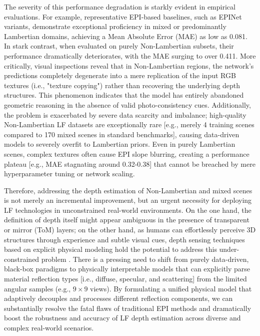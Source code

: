 \documentclass[lettersize,journal]{IEEEtran}
\begin{document}
The severity of this performance degradation is starkly evident in empirical evaluations. For example, representative EPI-based baselines, such as EPINet variants, demonstrate exceptional proficiency in mixed or predominantly Lambertian domains, achieving a Mean Absolute Error (MAE) as low as 0.081. In stark contrast, when evaluated on purely Non-Lambertian subsets, their performance dramatically deteriorates, with the MAE surging to over 0.411. More critically, visual inspections reveal that in Non-Lambertian regions, the network's predictions completely degenerate into a mere replication of the input RGB textures (i.e., "texture copying") rather than recovering the underlying depth structures. This phenomenon indicates that the model has entirely abandoned geometric reasoning in the absence of valid photo-consistency cues. Additionally, the problem is exacerbated by severe data scarcity and imbalance; high-quality Non-Lambertian LF datasets are exceptionally rare  [e.g., merely 4 training scenes compared to 170 mixed scenes in standard benchmarks], causing data-driven models to severely overfit to Lambertian priors. Even in purely Lambertian scenes, complex textures often cause EPI slope blurring, creating a performance plateau  [e.g., MAE stagnating around 0.32-0.38] that cannot be breached by mere hyperparameter tuning or network scaling.

Therefore, addressing the depth estimation of Non-Lambertian and mixed scenes is not merely an incremental improvement, but an urgent necessity for deploying LF technologies in unconstrained real-world environments. On the one hand, the definition of depth itself might appear ambiguous in the presence of transparent or mirror (ToM) layers; on the other hand, as humans can effortlessly perceive 3D structures through experience and subtle visual cues, depth sensing techniques based on explicit physical modeling hold the potential to address this under-constrained problem \cite{transparentormirrorsurfaces}. There is a pressing need to shift from purely data-driven, black-box paradigms to physically interpretable models that can explicitly parse material reflection types  [i.e., diffuse, specular, and scattering] from the limited angular samples (e.g., $9 \times 9$ views). By formulating a unified physical model that adaptively decouples and processes different reflection components, we can substantially resolve the fatal flaws of traditional EPI methods and dramatically boost the robustness and accuracy of LF depth estimation across diverse and complex real-world scenarios.
\end{document}

